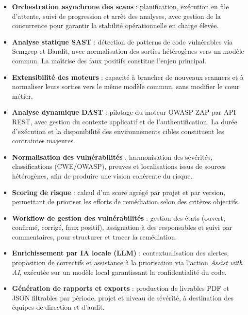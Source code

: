\begin{itemize}
  \item \textbf{Orchestration asynchrone des scans} : planification, exécution en file
  d'attente, suivi de progression et arrêt des analyses, avec gestion de la concurrence
  pour garantir la stabilité opérationnelle en charge élevée.

  \item \textbf{Analyse statique SAST} : détection de patterns de code vulnérables via
  Semgrep et Bandit, avec normalisation des sorties hétérogènes vers un modèle commun.
  La maîtrise des faux positifs constitue l'enjeu principal.

  \item \textbf{Extensibilité des moteurs} : capacité à brancher de nouveaux
  scanners et à normaliser leurs sorties vers le même modèle commun, sans modifier
  le cœur métier.

  \item \textbf{Analyse dynamique DAST} : pilotage du moteur OWASP ZAP par API REST,
  avec gestion du contexte applicatif et de l'authentification. La durée d'exécution
  et la disponibilité des environnements cibles constituent les contraintes majeures.

  \item \textbf{Normalisation des vulnérabilités} : harmonisation des sévérités,
  classifications (CWE/OWASP), preuves et localisations issus de sources hétérogènes,
  afin de produire une vision cohérente du risque.

  \item \textbf{Scoring de risque} : calcul d'un score agrégé par projet et par version,
  permettant de prioriser les efforts de remédiation selon des critères objectifs.

  \item \textbf{Workflow de gestion des vulnérabilités} : gestion des états (ouvert,
  confirmé, corrigé, faux positif), assignation à des responsables et suivi par
  commentaires, pour structurer et tracer la remédiation.

  \item \textbf{Enrichissement par IA locale (LLM)} : contextualisation des alertes,
  proposition de correctifs et assistance à la priorisation via l'action
  \textit{Assist with AI}, exécutée sur un modèle local garantissant la confidentialité
  du code.

  \item \textbf{Génération de rapports et exports} : production de livrables PDF et JSON
  filtrables par période, projet et niveau de sévérité, à destination des équipes de
  direction et d'audit.


\end{itemize}
